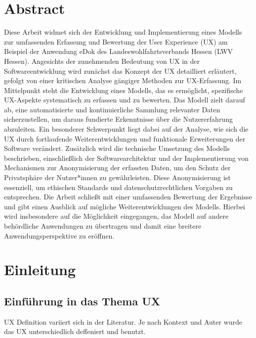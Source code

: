 \documentclass[12pt,oneside]{article}
\begin{document}
\section{Abstract}
Diese Arbeit widmet sich der Entwicklung und Implementierung eines Modells zur umfassenden Erfassung und Bewertung der User Experience (UX) am Beispiel der Anwendung eDok des Landeswohlfahrtsverbands Hessen (LWV Hessen). Angesichts der zunehmenden Bedeutung von UX in der Softwareentwicklung wird zunächst das Konzept der UX detailliert erläutert, gefolgt von einer kritischen Analyse gängiger Methoden zur UX-Erfassung. Im Mittelpunkt steht die Entwicklung eines Modells, das es ermöglicht, spezifische UX-Aspekte systematisch zu erfassen und zu bewerten. Das Modell zielt darauf ab, eine automatisierte und kontinuierliche Sammlung relevanter Daten sicherzustellen, um daraus fundierte Erkenntnisse über die Nutzererfahrung abzuleiten. Ein besonderer Schwerpunkt liegt dabei auf der Analyse, wie sich die UX durch fortlaufende Weiterentwicklungen und funktionale Erweiterungen der Software verändert. Zusätzlich wird die technische Umsetzung des Modells beschrieben, einschließlich der Softwarearchitektur und der Implementierung von Mechanismen zur Anonymisierung der erfassten Daten, um den Schutz der Privatsphäre der Nutzer*innen zu gewährleisten. Diese Anonymisierung ist essenziell, um ethischen Standards und datenschutzrechtlichen Vorgaben zu entsprechen. Die Arbeit schließt mit einer umfassenden Bewertung der Ergebnisse und gibt einen Ausblick auf mögliche Weiterentwicklungen des Modells. Hierbei wird insbesondere auf die Möglichkeit eingegangen, das Modell auf andere behördliche Anwendungen zu übertragen und damit eine breitere Anwendungsperspektive zu eröffnen.
\section{Einleitung}
\subsection{Einführung in das Thema UX}
UX Definition variiert sich in der Literatur. Je nach Kontext und Auter wurde das UX unterschiedlich deffeniert und benutzt.  \cite{clemen1989combining} \cite{shiny1} \cite{shiny1}
 
\end{document}
